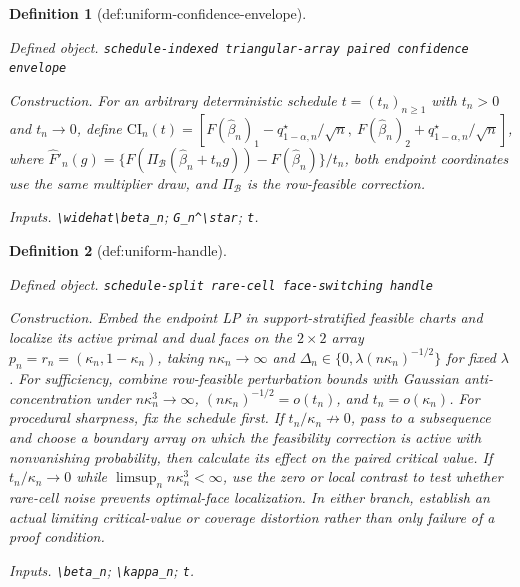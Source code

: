 \documentclass{article}
\newtheorem{definition}{Definition}
\begin{document}
\begin{definition}[def:uniform-confidence-envelope]\label{def:uniform-confidence-envelope}
\par\smallskip\noindent\emph{Defined object.} \texttt{schedule-\allowbreak{}indexed triangular-\allowbreak{}array paired confidence envelope}
\par\smallskip\noindent\emph{Construction.} For an arbitrary deterministic schedule \(t=(t_n)_{n\ge1}\) with \(t_n>0\) and \(t_n\to0\), define \(\mathrm{CI}_n(t)=[F(\widehat\beta_n)_1-q_{1-\alpha,n}^\star/\sqrt n,\ F(\widehat\beta_n)_2+q_{1-\alpha,n}^\star/\sqrt n]\), where \(\widehat F'_n(g)=\{F(\Pi_{\mathcal B}(\widehat\beta_n+t_ng))-F(\widehat\beta_n)\}/t_n\), both endpoint coordinates use the same multiplier draw, and \(\Pi_{\mathcal B}\) is the row-feasible correction.
\par\smallskip\noindent\emph{Inputs.} \texttt{\textbackslash{}\allowbreak{}widehat\textbackslash{}\allowbreak{}beta\_\allowbreak{}n}; \texttt{G\_\allowbreak{}n\textasciicircum{}\textbackslash{}\allowbreak{}star}; \texttt{t}.
\end{definition}

\begin{definition}[def:uniform-handle]\label{def:uniform-handle}
\par\smallskip\noindent\emph{Defined object.} \texttt{schedule-\allowbreak{}split rare-\allowbreak{}cell face-\allowbreak{}switching handle}
\par\smallskip\noindent\emph{Construction.} Embed the endpoint LP in support-stratified feasible charts and localize its active primal and dual faces on the \(2\times2\) array \(p_n=r_n=(\kappa_n,1-\kappa_n)\), taking \(n\kappa_n\to\infty\) and \(\Delta_n\in\{0,\lambda(n\kappa_n)^{-1/2}\}\) for fixed \(\lambda\). For sufficiency, combine row-feasible perturbation bounds with Gaussian anti-concentration under \(n\kappa_n^3\to\infty\), \((n\kappa_n)^{-1/2}=o(t_n)\), and \(t_n=o(\kappa_n)\). For procedural sharpness, fix the schedule first. If \(t_n/\kappa_n\not\to0\), pass to a subsequence and choose a boundary array on which the feasibility correction is active with nonvanishing probability, then calculate its effect on the paired critical value. If \(t_n/\kappa_n\to0\) while \(\limsup_n n\kappa_n^3<\infty\), use the zero or local contrast to test whether rare-cell noise prevents optimal-face localization. In either branch, establish an actual limiting critical-value or coverage distortion rather than only failure of a proof condition.
\par\smallskip\noindent\emph{Inputs.} \texttt{\textbackslash{}\allowbreak{}beta\_\allowbreak{}n}; \texttt{\textbackslash{}\allowbreak{}kappa\_\allowbreak{}n}; \texttt{t}.
\end{definition}
\end{document}
